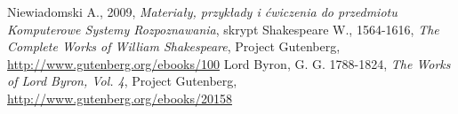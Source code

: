 \documentclass[a4paper]{classrep}
\begin{document}
\begin{thebibliography}{2}
 Niewiadomski A., 2009, \textit{Materiały, przykłady i ćwiczenia do przedmiotu Komputerowe Systemy Rozpoznawania}, skrypt
 Shakespeare W., 1564-1616, \textit{The Complete Works of William Shakespeare}, Project Gutenberg, \url{http://www.gutenberg.org/ebooks/100}
 Lord Byron, G. G. 1788-1824, \textit{The Works of Lord Byron, Vol. 4}, Project Gutenberg, \url{http://www.gutenberg.org/ebooks/20158}
\end{thebibliography}
\end{document}
